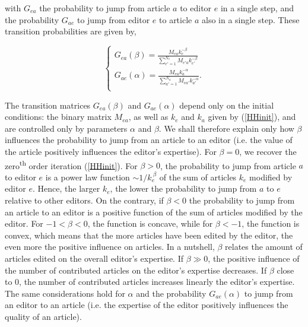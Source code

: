 with $G_{ea}$ the probability  to jump from article $a$ to editor $e$ in a single step, and the probability $G_{ae}$ to jump from editor $e$ to article $a$ also in a single step. These transition probabilities are given by,

\begin{equation}
\begin{cases}
G_{ea}(\beta) = \frac{M_{ea} k_{e}^{-\beta}}{\sum_{e' = 1}^{N_e} M_{e'a} k_{e'}^{-\beta}}\\[10pt]
G_{ae}(\alpha) = \frac{M_{ea} k_{a}^{-\alpha}}{\sum_{a' = 1}^{N_a} M_{ea'} k_{a'}^{-\alpha}}.\\
 \end{cases}
\end{equation}

The transition matrices $G_{ea}(\beta)$ and $G_{ae}(\alpha)$ depend only on the initial conditions: the binary matrix $M_{ea}$, as well as $k_e$ and $k_a$ given by (\ref{HHinit}), and are controlled only by parameters $\alpha$ and $\beta$.  We shall therefore explain only how $\beta$ influences the probability to jump from an article to an editor (i.e. the value of the article positively influences the editor's expertise). For $\beta = 0$, we recover the zero\textsuperscript{th} order iteration (\ref{HHinit}). For $\beta > 0$, the probability to jump from article $a$ to editor $e$ is a power law function $\sim 1/k_{e}^{~\beta}$ of the sum of articles $k_{e}$  modified by editor $e$. Hence, the larger $k_{e}$, the lower the probability to jump from $a$ to $e$ relative to other editors. On the contrary, if $\beta < 0$ the probability to jump from an article to an editor is a positive function of the sum of articles modified by the editor. For $-1 < \beta < 0$, the function is concave, while for $\beta < -1$, the function is convex, which means that the more articles have been edited by the editor, the even more the positive influence on articles. In a nutshell, $\beta$ relates the amount of articles edited on the overall editor's expertise. %
If $\beta \gg 0$, the positive influence of the number of contributed articles on the editor's expertise decreases. If $\beta$ close to $0$, the number of contributed articles increases linearly the editor's expertise. The same considerations hold for $\alpha$ and the probability $G_{ae}(\alpha)$ to jump from an editor to an article (i.e. the expertise of the editor positively influences the quality of an article).

